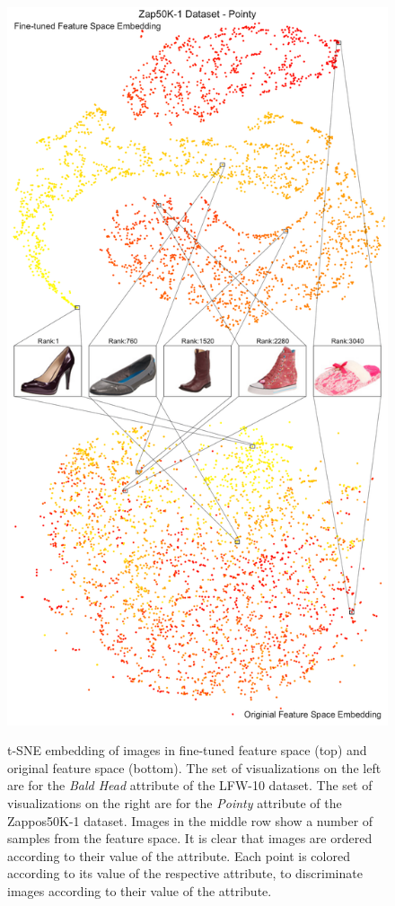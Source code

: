 \begin{figure}
{\includegraphics{zappos-pointy-featspace.pdf}
}
\caption{t-SNE embedding of images in fine-tuned feature space (top) and original feature space (bottom). The set of visualizations on the left are for the \textit{Bald Head} attribute of the LFW-10 dataset. The set of visualizations on the right are for the \textit{Pointy} attribute of the Zappos50K-1 dataset. Images in the middle row show a number of samples from the feature space. It is clear that images are ordered according to their value of the attribute. Each point is colored according to its value of the respective attribute, to discriminate images according to their value of the attribute.}
\label{featspace}
\end{figure}


